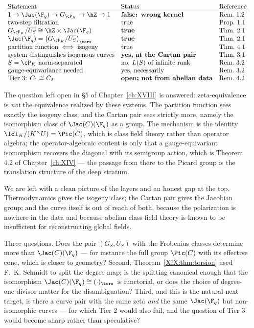\[
\begin{array}{lll}
\text{Statement} & \text{Status} & \text{Reference}\\\hline
1\to\Jac(\F_q)\to G_{\cP_K}\to\hZ\to1 & \textbf{false: wrong kernel} & \text{Rem.~1.2}\\
\text{two-step filtration} & \text{true} & \text{Prop.~1.1}\\
G_{\cP_K}/\overline{U_S}\cong\hZ\times\Jac(\F_q) & \textbf{true} & \text{Thm.~2.1}\\
\Jac(\F_q)=\bigl(G_{\cP_K}/\overline{U_S}\bigr)_{\tors} & \textbf{true} & \text{Thm.~2.1}\\
\text{partition function}\iff\text{isogeny} & \text{true} & \text{Thm.~4.1}\\
\text{system distinguishes isogenous curves} & \textbf{yes, at the Cartan pair} & \text{Thm.~3.1}\\
S=\cP_K\ \text{norm-separated} & \text{no; }L(S)\ \text{of infinite rank} & \text{Rem.~3.2}\\
\text{gauge-equivariance needed} & \text{yes, necessarily} & \text{Rem.~3.2}\\
\text{Tier 3: }C_1\cong C_2 & \textbf{open; not from abelian data} & \text{Rem.~4.2}
\end{array}
\]

The question left open in \S5 of Chapter~\ref{ch:XVIII} is answered: zeta-equivalence is
\emph{not} the equivalence realized by these systems. The partition function sees exactly the
isogeny class, and the Cartan pair sees strictly more, namely the isomorphism class of
$\Jac(C)(\F_q)$ as a group. The mechanism is the identity
$\Idl_K/(K^\times U)=\Pic(C)$, which is class field theory rather than operator algebra; the
operator-algebraic content is only that a gauge-equivariant isomorphism recovers the
diagonal with its semigroup action, which is Theorem 4.2 of Chapter~\ref{ch:XIV} --- the passage from
there to the Picard group is the translation structure of the deep stratum.

We are left with a clean picture of the layers and an honest gap at the top. Thermodynamics
gives the isogeny class; the Cartan pair gives the Jacobian group; and the curve itself is
out of reach of both, because the polarization is nowhere in the data and because abelian
class field theory is known to be insufficient for reconstructing global fields.

Three questions. Does the pair $(G_S,U_S)$ with the Frobenius classes determine more than
$\Jac(C)(\F_q)$ --- for instance the full group $\Pic(C)$ with its effective cone, which is
closer to geometry? Second, Theorem~\ref{XIX:thm:torsion} used F.~K. Schmidt to split the degree
map; is the splitting canonical enough that the isomorphism $\Jac(C)(\F_q)\cong(\cdot)_\tors$
is functorial, or does the choice of degree-one divisor matter for the disambiguation?
Third, and this is the natural next target, is there a curve pair with the same zeta
\emph{and} the same $\Jac(\F_q)$ but non-isomorphic curves --- for which Tier 2 would also
fail, and the question of Tier 3 would become sharp rather than speculative?

